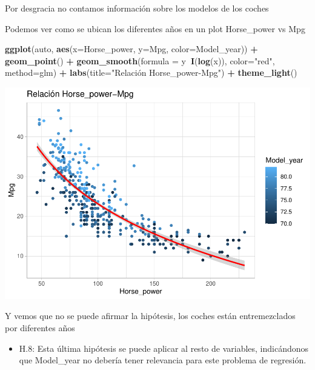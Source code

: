 \documentclass[
]{article}
\newenvironment{Shaded}{\begin{snugshade}}{\end{snugshade}}
\newcommand{\DataTypeTok}[1]{\textcolor[rgb]{0.13,0.29,0.53}{#1}}
\newcommand{\KeywordTok}[1]{\textcolor[rgb]{0.13,0.29,0.53}{\textbf{#1}}}
\newcommand{\NormalTok}[1]{#1}
\newcommand{\OperatorTok}[1]{\textcolor[rgb]{0.81,0.36,0.00}{\textbf{#1}}}
\newcommand{\StringTok}[1]{\textcolor[rgb]{0.31,0.60,0.02}{#1}}
\providecommand{\tightlist}{%
  \setlength{\itemsep}{0pt}\setlength{\parskip}{0pt}}
\begin{document}
Por desgracia no contamos información sobre los modelos de los coches

Podemos ver como se ubican los diferentes años en un plot Horse\_power
vs Mpg

\begin{Shaded}
\begin{Highlighting}[]
\KeywordTok{ggplot}\NormalTok{(auto, }\KeywordTok{aes}\NormalTok{(}\DataTypeTok{x=}\NormalTok{Horse_power, }\DataTypeTok{y=}\NormalTok{Mpg, }\DataTypeTok{color=}\NormalTok{Model_year)) }\OperatorTok{+}
\StringTok{  }\KeywordTok{geom_point}\NormalTok{() }\OperatorTok{+}
\StringTok{  }\KeywordTok{geom_smooth}\NormalTok{(}\DataTypeTok{formula =}\NormalTok{ y}\OperatorTok{~}\KeywordTok{I}\NormalTok{(}\KeywordTok{log}\NormalTok{(x)), }\DataTypeTok{color=}\StringTok{"red"}\NormalTok{, }\DataTypeTok{method=}\NormalTok{glm) }\OperatorTok{+}
\StringTok{  }\KeywordTok{labs}\NormalTok{(}\DataTypeTok{title=}\StringTok{"Relación Horse_power-Mpg"}\NormalTok{) }\OperatorTok{+}
\StringTok{  }\KeywordTok{theme_light}\NormalTok{()}
\end{Highlighting}
\end{Shaded}

\begin{center}\includegraphics{EDA_files/figure-latex/unnamed-chunk-33-1} \end{center}

Y vemos que no se puede afirmar la hipótesis, los coches están
entremezclados por diferentes años

\begin{itemize}
\tightlist
\item
  H.8: Esta última hipótesis se puede aplicar al resto de variables,
  indicándonos que Model\_year no debería tener relevancia para este
  problema de regresión.
\end{itemize}
\end{document}
